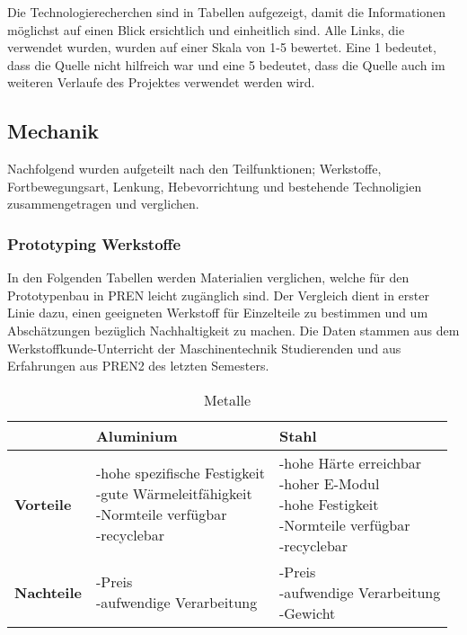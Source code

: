 Die Technologierecherchen sind in Tabellen aufgezeigt, damit die Informationen möglichst auf einen Blick ersichtlich und einheitlich sind. Alle Links, die verwendet wurden, wurden auf einer Skala von 1-5 bewertet. Eine 1 bedeutet, dass die Quelle nicht hilfreich war und eine 5 bedeutet, dass die Quelle auch im weiteren Verlaufe des Projektes verwendet werden wird.

\subsection{Mechanik}

Nachfolgend wurden aufgeteilt nach den Teilfunktionen; Werkstoffe, Fortbewegungsart, Lenkung, Hebevorrichtung und bestehende Technoligien zusammengetragen und verglichen.

\subsubsection{Prototyping Werkstoffe}

In den Folgenden Tabellen werden Materialien verglichen, welche für den Prototypenbau in PREN leicht zugänglich sind. Der Vergleich dient in erster Linie dazu, einen geeigneten Werkstoff für Einzelteile zu bestimmen und um Abschätzungen bezüglich Nachhaltigkeit zu machen. Die Daten stammen aus dem Werkstoffkunde-Unterricht der Maschinentechnik Studierenden und aus Erfahrungen aus PREN2 des letzten Semesters.

\begin{table}[H]
\centering
\small
\begin{tabularx}{\textwidth}{|l|X|X|}
\hline
  \textbf{} & \textbf{Aluminium} & \textbf{Stahl} \\
  \hline
  \textbf{Vorteile}  & \makecell{-hohe spezifische Festigkeit\\ -gute Wärmeleitfähigkeit \\ -Normteile verfügbar \\ -recyclebar} & \makecell{-hohe Härte erreichbar \\-hoher E-Modul\\-hohe Festigkeit \\ -Normteile verfügbar\\ -recyclebar}\\ 
  \hline
  \textbf{Nachteile} & \makecell{-Preis \\ -aufwendige Verarbeitung \\} & \makecell{-Preis\\-aufwendige Verarbeitung \\ -Gewicht}\\
  \hline
\end{tabularx}
\caption{Metalle}
\label{table:metals-comparison}
\end{table}


